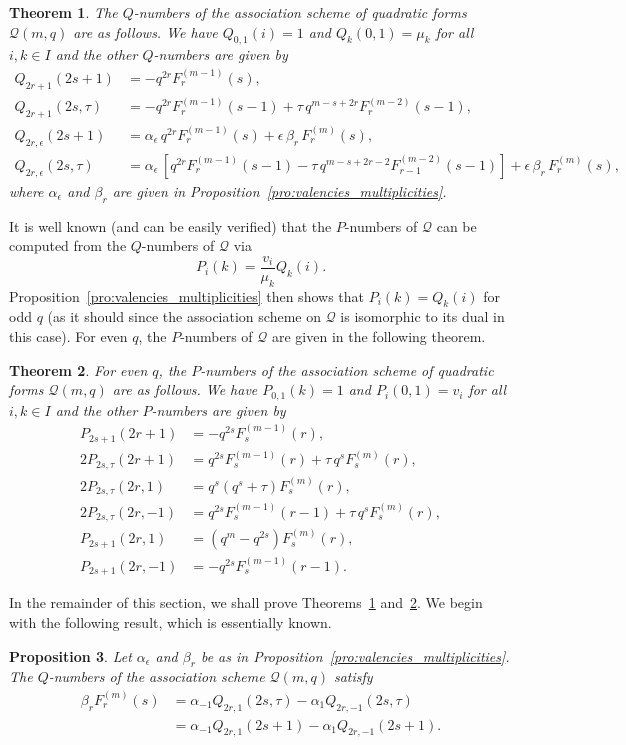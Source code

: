 \documentclass[10pt]{article}
\newtheorem{theorem}{Theorem}[section]
\newtheorem{prop}[theorem]{Proposition}
\theoremstyle{definition}
\newcommand{\Q}{\mathscr{Q}}
\renewcommand{\t}{\tau}
\newcommand{\e}{\epsilon}
\begin{document}
\begin{theorem}
\label{thm:Q_numbers}
The $Q$-numbers of the association scheme of quadratic forms $\Q(m,q)$ are as follows. We have $Q_{0,1}(i)=1$ and $Q_k(0,1)=\mu_k$ for all $i,k\in I$ and the other $Q$-numbers are given by
\begin{align*}
Q_{2r+1}(2s+1)&=-q^{2r}F^{(m-1)}_r(s),\\
Q_{2r+1}(2s,\t)&=-q^{2r}F^{(m-1)}_r(s-1)+\tau\, q^{m-s+2r}F^{(m-2)}_r(s-1),\\
Q_{2r,\e}(2s+1)&=\alpha_\e\, q^{2r}F^{(m-1)}_r(s)+\e\,\beta_r\,F^{(m)}_r(s),\\
Q_{2r,\e}(2s,\t)&=\alpha_\e\,[q^{2r}F^{(m-1)}_r(s-1)-\tau\, q^{m-s+2r-2}F^{(m-2)}_{r-1}(s-1)]+\e\,\beta_r\,F^{(m)}_r(s),
\end{align*}
where $\alpha_\e$ and $\beta_r$ are given in Proposition~\ref{pro:valencies_multiplicities}.
\end{theorem}
\par
It is well known (and can be easily verified) that the $P$-numbers of $\Q$ can be computed from the $Q$-numbers of $\Q$ via
\[
P_i(k)=\frac{v_i}{\mu_k}Q_k(i).
\]
Proposition~\ref{pro:valencies_multiplicities} then shows that $P_i(k)=Q_k(i)$ for odd $q$ (as it should since the association scheme on $\Q$ is isomorphic to its dual in this case). For even $q$, the $P$-numbers of $\Q$ are given in the following theorem.
\begin{theorem}
\label{thm:P_numbers}
For even $q$, the $P$-numbers of the association scheme of quadratic forms $\Q(m,q)$ are as follows. We have $P_{0,1}(k)=1$ and $P_i(0,1)=v_i$ for all $i,k\in I$ and the other $P$-numbers are given by
\begin{align*}
P_{2s+1}(2r+1)&=-q^{2s}F^{(m-1)}_s(r),\\
2P_{2s,\t}(2r+1)&=q^{2s}F^{(m-1)}_s(r)+\t\, q^s F^{(m)}_s(r),\\
2P_{2s,\t}(2r,1)&=q^s(q^s+\t)F^{(m)}_s(r),\\
2P_{2s,\t}(2r,-1)&=q^{2s}F^{(m-1)}_s(r-1)+\t\,q^sF^{(m)}_s(r),\\
P_{2s+1}(2r,1)&=(q^m-q^{2s})F^{(m)}_s(r),\\
P_{2s+1}(2r,-1)&=-q^{2s}F^{(m-1)}_s(r-1).
\end{align*}
\end{theorem}
\par
In the remainder of this section, we shall prove Theorems~\ref{thm:Q_numbers} and~\ref{thm:P_numbers}. We begin with the following result, which is essentially known. 
\begin{prop}
\label{pro:Q_alt}
Let $\alpha_\e$ and $\beta_r$ be as in Proposition~\ref{pro:valencies_multiplicities}. The $Q$-numbers of the association scheme $\Q(m,q)$ satisfy
\begin{align*}
\beta_rF^{(m)}_r(s)&=\alpha_{-1}Q_{2r,1}(2s,\t)-\alpha_1Q_{2r,-1}(2s,\t)\\
&=\alpha_{-1}Q_{2r,1}(2s+1)-\alpha_1Q_{2r,-1}(2s+1).
\end{align*}
\end{prop}
\end{document}
